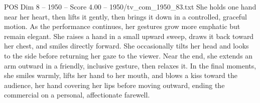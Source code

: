 \begin{textsample}{POS Dim 8 – 1950 – Score 4.00 – 1950/tv\_com\_1950\_83.txt}
She holds one hand near her heart, then lifts it gently, then brings it down in a controlled, graceful motion.
As the performance continues, her gestures grow more emphatic but remain elegant.
She raises a hand in a small upward sweep, draws it back toward her chest, and smiles directly forward.
She occasionally tilts her head and looks to the side before returning her gaze to the viewer.
Near the end, she extends an arm outward in a friendly, inclusive gesture, then relaxes it.
In the final moments, she smiles warmly, lifts her hand to her mouth, and blows a kiss toward the audience, her hand covering her lips before moving outward, ending the commercial on a personal, affectionate farewell.

\end{textsample}
